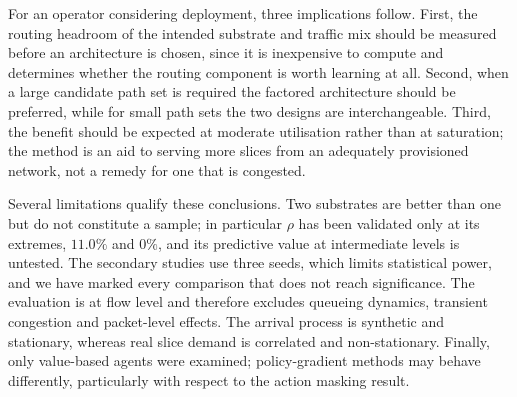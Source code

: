 \documentclass[10pt,journal,comsoc]{IEEEtran}
\begin{document}
For an operator considering deployment, three implications follow.
First, the routing headroom of the intended substrate and traffic mix
should be measured before an architecture is chosen, since it is
inexpensive to compute and determines whether the routing component is
worth learning at all. Second, when a large candidate path set is
required the factored architecture should be preferred, while for small
path sets the two designs are interchangeable. Third, the benefit should
be expected at moderate utilisation rather than at saturation; the method
is an aid to serving more slices from an adequately provisioned network,
not a remedy for one that is congested.

Several limitations qualify these conclusions. Two substrates are better
than one but do not constitute a sample; in particular $\rho$ has been
validated only at its extremes, $11.0\%$ and $0\%$, and its predictive
value at intermediate levels is untested. The secondary studies use three
seeds, which limits statistical power, and we have marked every
comparison that does not reach significance. The evaluation is at flow
level and therefore excludes queueing dynamics, transient congestion and
packet-level effects. The arrival process is synthetic and stationary,
whereas real slice demand is correlated and non-stationary. Finally, only
value-based agents were examined; policy-gradient methods may behave
differently, particularly with respect to the action masking result.
\end{document}
